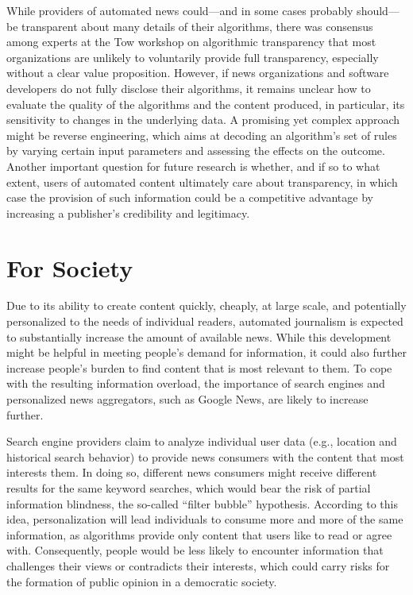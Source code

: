 \documentclass[notoc, symmetric, nobib, nols]{towcenter-guideto-book}
\begin{document}
While providers of automated news could---and in some cases probably should---be transparent about many details of their algorithms, there was consensus among experts at the Tow workshop on algorithmic transparency that most organizations are unlikely to voluntarily provide full transparency, especially without a clear value proposition. However, if news organizations and software developers do not fully disclose their algorithms, it remains unclear how to evaluate the quality of the algorithms and the content produced, in particular, its sensitivity to changes in the underlying data. A promising yet complex approach might be reverse engineering, which aims at decoding an algorithm's set of rules by varying certain input parameters and assessing the effects on the outcome.\autocite{diak152} Another important question for future research is whether, and if so to what extent, users of automated content ultimately care about transparency, in which case the provision of such information could be a competitive advantage by increasing a publisher's credibility and legitimacy.\autocite{diak15}

\section{For Society}

Due to its ability to create content quickly, cheaply, at large scale, and potentially personalized to the needs of individual readers, automated journalism is expected to substantially increase the amount of available news. While this development might be helpful in meeting people's demand for information, it could also further increase people's burden to find content that is most relevant to them. To cope with the resulting information overload, the importance of search engines and personalized news aggregators, such as Google News, are likely to increase further. 

Search engine providers claim to analyze individual user data (e.g., location and historical search behavior) to provide news consumers with the content that most interests them. In doing so, different news consumers might receive different results for the same keyword searches, which would bear the risk of partial information blindness, the so-called ``filter bubble'' hypothesis.\autocite{paris11} According to this idea, personalization will lead individuals to consume more and more of the same information, as algorithms provide only content that users like to read or agree with. Consequently, people would be less likely to encounter information that challenges their views or contradicts their interests, which could carry risks for the formation of public opinion in a democratic society. 
\end{document}
